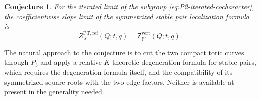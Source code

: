\documentclass{amsart}
\newtheorem{conjecture}{Conjecture}
\theoremstyle{definition}
\numberwithin{equation}{section}
\begin{document}
\begin{conjecture}
\label{conj:P2-vertex-comparison}
For the iterated limit of the subgroup \eqref{eq:P2-iterated-cocharacter}, the coefficientwise slope limit of the symmetrized stable pair localization formula is
\begin{equation}
 Z_{X}^{\mathrm{PT},\mathrm{ref}}(Q;t,q)
 =\mathsf Z_{\mathbb P^2}^{\mathrm{vert}}(Q;t,q).
\label{eq:P2-PT-equals-IK-vertex}
\end{equation}
\end{conjecture}

The natural approach to the conjecture is to cut the two compact toric curves through \(P_3\) and apply a relative \(K\)-theoretic degeneration formula for stable pairs, which requires the degeneration formula itself, and the compatibility of its symmetrized square roots with the two edge factors.  Neither is available at present in the generality needed.
\end{document}
